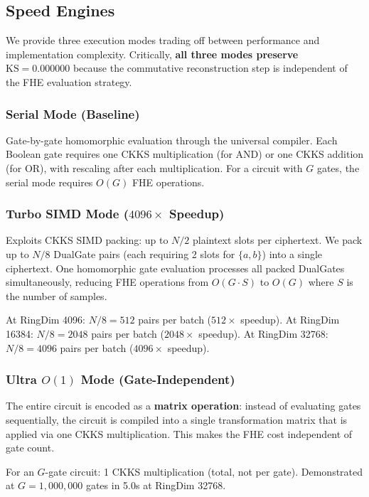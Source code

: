 \documentclass[11pt,a4paper]{article}
\begin{document}
\subsection{Speed Engines}

We provide three execution modes trading off between performance and implementation complexity. Critically, \textbf{all three modes preserve $\text{KS} = 0.000000$} because the commutative reconstruction step is independent of the FHE evaluation strategy.

\subsubsection{Serial Mode (Baseline)}

Gate-by-gate homomorphic evaluation through the universal compiler. Each Boolean gate requires one CKKS multiplication (for AND) or one CKKS addition (for OR), with rescaling after each multiplication. For a circuit with $G$ gates, the serial mode requires $O(G)$ FHE operations.

\subsubsection{Turbo SIMD Mode ($4096\times$ Speedup)}

Exploits CKKS SIMD packing: up to $N/2$ plaintext slots per ciphertext. We pack up to $N/8$ DualGate pairs (each requiring 2 slots for $\{a,b\}$) into a single ciphertext. One homomorphic gate evaluation processes all packed DualGates simultaneously, reducing FHE operations from $O(G \cdot S)$ to $O(G)$ where $S$ is the number of samples.

At RingDim 4096: $N/8 = 512$ pairs per batch ($512\times$ speedup).  
At RingDim 16384: $N/8 = 2048$ pairs per batch ($2048\times$ speedup).  
At RingDim 32768: $N/8 = 4096$ pairs per batch ($4096\times$ speedup).

\subsubsection{Ultra $O(1)$ Mode (Gate-Independent)}

The entire circuit is encoded as a \textbf{matrix operation}: instead of evaluating gates sequentially, the circuit is compiled into a single transformation matrix that is applied via one CKKS multiplication. This makes the FHE cost independent of gate count.

For an $G$-gate circuit: 1 CKKS multiplication (total, not per gate).  
Demonstrated at $G = 1,000,000$ gates in 5.0s at RingDim 32768.
\end{document}
